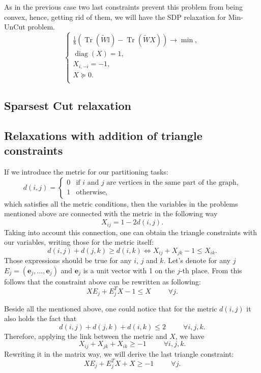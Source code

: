 \documentclass[12pt]{article}
\DeclareMathOperator{\trace}{Tr}
\DeclareMathOperator{\diag}{diag}
\begin{document}
As in the previous case two last constraints prevent this problem from being convex, hence, getting rid of them, we will have the SDP relaxation for Min-UnCut problem.
\begin{equation}
    \label{minuncut_rel}
    \begin{cases}
        \frac 18 \left(\trace(\tilde W \mathbb{I}) - \trace( \tilde W X)\right) \longrightarrow \min,\\
        \diag(X) = 1,\\
        X_{i, -i} = -1,\\
        X \succeq 0.\\
    \end{cases}
\end{equation}

\subsection{Sparsest Cut relaxation}


\subsection{Relaxations with addition of triangle constraints}

If we introduce the metric for our partitioning tasks:
\[
d(i,j) = \begin{cases}
    0 & \text{if $i$ and $j$ are vertices in the same part of the graph,}\\
    1 & \text{otherwise,}
\end{cases}
\]
which satisfies all the metric conditions, then the variables in the problems mentioned above are connected with the metric in the following way
\[
X_{ij} = 1 - 2d(i,j).
\]
Taking into account this connection, one can obtain the triangle constraints with our variables, writing those for the metric itself:
\[
d(i,j) + d(j, k) \geq d(i,k) \Leftrightarrow X_{ij} + X_{jk} - 1 \leq X_{ik}. 
\]
Those expressions should be true for any $i$, $j$ and $k$. Let's denote for any $j$ $E_j = (\mathbf{e}_j, \dots, \mathbf{e}_j)$ and $\mathbf{e}_j$ is a unit vector with 1 on the $j$-th place. From this follows that the constraint above can be rewritten as following:
\[
XE_j + E_j^T X - 1 \leq X ~~~~~~~~~~~ \forall j. 
\]

Beside all the mentioned above, one could notice that for the metric $d(i,j)$ it also holds the fact that
\[
d(i,j) + d(j,k) + d(i,k) \leq 2 ~~~~~~~~~~~ \forall i, j, k.
\]
Therefore, applying the link between the metric and $X$, we have
\[
X_{ij} + X_{jk} + X_{ik} \geq -1 ~~~~~~~~~~~ \forall i, j, k.
\]
Rewriting it in the matrix way, we will derive the last triangle constraint:
\[
XE_j + E_j^T X + X \geq -1 ~~~~~~~~~~~ \forall j.
\]
\end{document}
